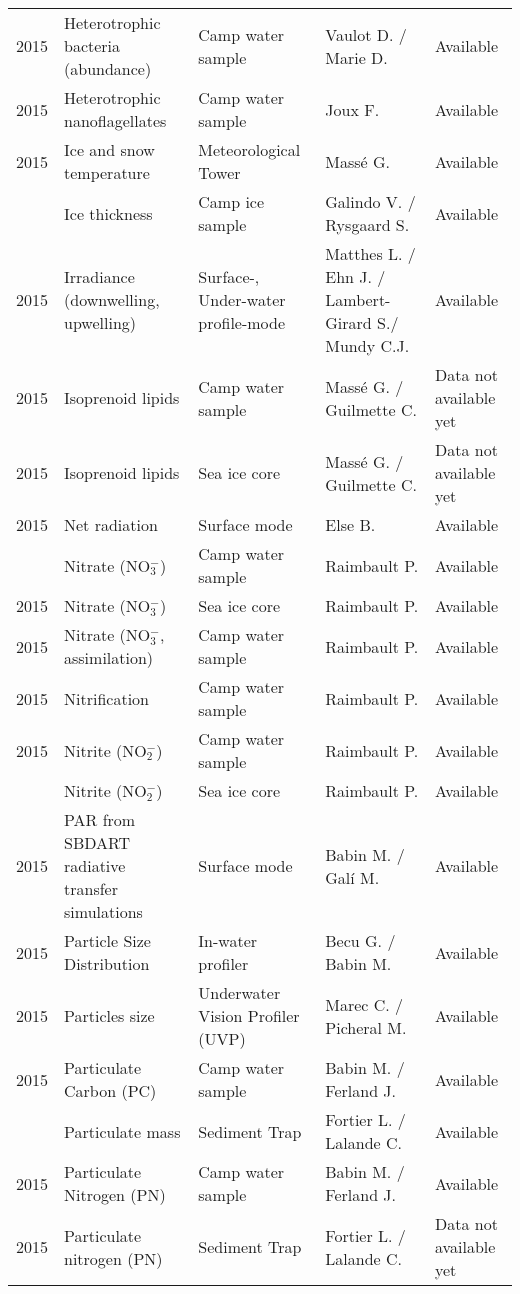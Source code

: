 \documentclass[]{article}
\begin{document}
\begin{landscape}
\begin{longtable}{rllll}
2015 & Heterotrophic bacteria (abundance) & Camp water sample & Vaulot D. / Marie D. & Available\\
2015 & Heterotrophic nanoflagellates & Camp water sample & Joux F. & Available\\
2015 & Ice and snow temperature & Meteorological Tower & Massé G. & Available\\
\addlinespace
2015 & Ice thickness & Camp ice sample & Galindo V. / Rysgaard S. & Available\\
2015 & Irradiance (downwelling, upwelling) & Surface-, Under-water profile-mode & Matthes L. / Ehn J. / Lambert-Girard S./ Mundy C.J. & Available\\
2015 & Isoprenoid lipids & Camp water sample & Massé G. / Guilmette C. & Data not available yet\\
2015 & Isoprenoid lipids & Sea ice core & Massé G. / Guilmette C. & Data not available yet\\
2015 & Net radiation & Surface mode & Else B. & Available\\
\addlinespace
2015 & Nitrate (NO$^-_3$) & Camp water sample & Raimbault P. & Available\\
2015 & Nitrate (NO$^-_3$) & Sea ice core & Raimbault P. & Available\\
2015 & Nitrate (NO$^-_3$, assimilation) & Camp water sample & Raimbault P. & Available\\
2015 & Nitrification & Camp water sample & Raimbault P. & Available\\
2015 & Nitrite (NO$^-_2$) & Camp water sample & Raimbault P. & Available\\
\addlinespace
2015 & Nitrite (NO$^-_2$) & Sea ice core & Raimbault P. & Available\\
2015 & PAR from SBDART radiative transfer simulations & Surface mode & Babin M. / Galí M. & Available\\
2015 & Particle Size Distribution & In-water profiler & Becu G. / Babin M. & Available\\
2015 & Particles size & Underwater Vision Profiler (UVP) & Marec C. / Picheral M. & Available\\
2015 & Particulate Carbon (PC) & Camp water sample & Babin M. / Ferland J. & Available\\
\addlinespace
2015 & Particulate mass & Sediment Trap & Fortier L. / Lalande C. & Available\\
2015 & Particulate Nitrogen (PN) & Camp water sample & Babin M. / Ferland J. & Available\\
2015 & Particulate nitrogen (PN) & Sediment Trap & Fortier L. / Lalande C. & Data not available yet\\

\end{longtable}
\end{landscape}
\end{document}
